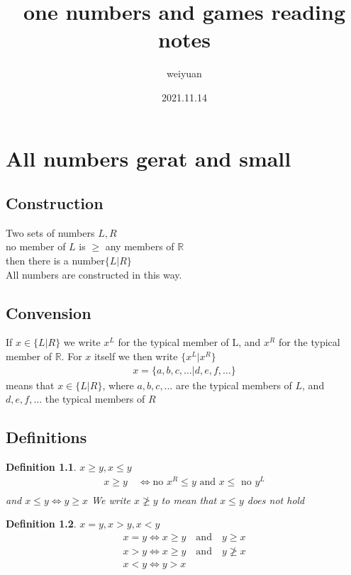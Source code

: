 \documentclass[10pt,a4paper]{book}
\title{one numbers and games reading notes}
\author{weiyuan}
\date{2021.11.14}
\newtheorem{myDef}{Definition}
\begin{document}
	\maketitle
\chapter{All numbers gerat and small}
\section{Construction}

Two sets of numbers $  L,R  $\\
no member of $ L $ is $ \ge  $ any members of $ \mathbb{R} $\\
then there is a number$ \{L|R\} $\\
All numbers are constructed in this way.\\

\section{Convension}

If $ x\in\{L|R\} $ we write $ x^L $ for the typical member of L, and $ x^R $ for the typical member of $ \mathbb{R} $. For $ x $ itself we then write $ \{x^L|x^R\} $ 
\begin{gather}
	x = \{ a,b,c,\dots | d,e,f,\dots \}
\end{gather}
means that $ x\in \{L|R\} $, where $ a,b,c,\dots $ are the typical members of $ L $, and $ d,e,f,\dots $ the typical members of $ R $\\

\section{Definitions}
\begin{myDef}
	$ x \ge y, x \le y $\\
	\begin{gather*}
		x \ge y \quad \iff \text{no } x^R \le y \text{ and } x \le \text{ no } y^L\\
	\end{gather*}
	and $ x\le y \iff y\ge x $
	We write $ x\ngeq y $ to mean that $ x \le y $ does not hold
	
\end{myDef}

\begin{myDef}
	$ x=y, x>y, x<y $\\
	\begin{gather*}
		x = y \iff x\ge y \quad\text{and}\quad y \ge x\\
		x > y \iff x\ge y \quad\text{and}\quad y \ngeq x\\
		x < y \iff y>x\\		
	\end{gather*}
	
\end{myDef}
\end{document}
